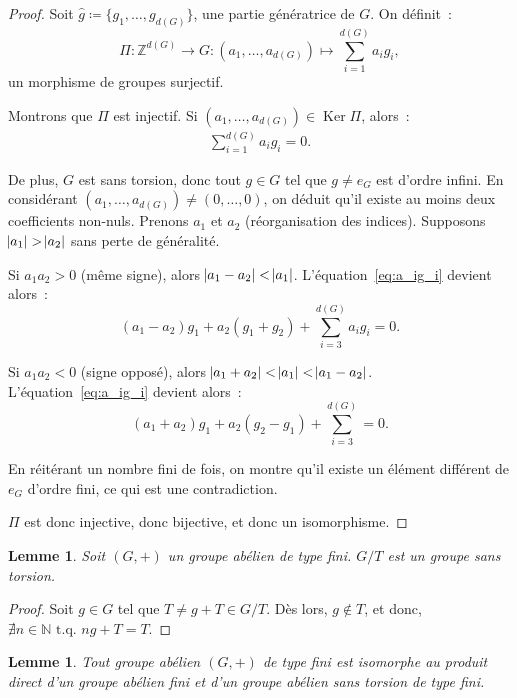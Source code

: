 \documentclass{article}
\newtheorem{lem}[thm]{Lemme}
\theoremstyle{definition}
\theoremstyle{remark}
\DeclareMathOperator{\Ker}{Ker}
\newcommand{\Z}{\mathbb Z}
\newcommand{\N}{\mathbb N}
\newcommand{\tq}{\text{ t.q. }}
\begin{document}
		\begin{proof} Soit $\hat g \coloneqq \{g_1, \ldots, g_{d(G)}\}$, une partie génératrice de $G$. On définit~:
		\[\Pi : \Z^{d(G)} \to G : (a_1, \ldots, a_{d(G)}) \mapsto \sum_{i=1}^{d(G)}a_ig_i,\]
		un morphisme de groupes surjectif.

		Montrons que $\Pi$ est injectif. Si $(a_1, \ldots, a_{d(G)}) \in \Ker \Pi$, alors~:
		\begin{align}\label{eq:a_ig_i}
			\sum_{i=1}^{d(G)}a_ig_i = 0.
		\end{align}

		De plus, $G$ est sans torsion, donc tout $g \in G$ tel que $g \neq e_G$ est d'ordre infini. En considérant $(a_1, \ldots, a_{d(G)}) \neq (0, \ldots, 0)$,
		on déduit qu'il existe au moins deux coefficients non-nuls. Prenons $a_1$ et $a_2$ (réorganisation des indices). Supposons $\abs {a_1} > \abs {a_2}$
		sans perte de généralité.

		Si $a_1a_2 > 0$ (même signe), alors $\abs {a_1-a_2} < \abs {a_1}$. L'équation~\eqref{eq:a_ig_i} devient alors~:
		\[(a_1-a_2)g_1 + a_2(g_1+g_2) + \sum_{i=3}^{d(G)}a_ig_i = 0.\]

		Si $a_1a_2 < 0$ (signe opposé), alors $\abs {a_1+a_2} < \abs {a_1} < \abs {a_1-a_2}$. L'équation~\eqref{eq:a_ig_i} devient alors~:
		\[(a_1+a_2)g_1 + a_2(g_2-g_1) + \sum_{i=3}^{d(G)} = 0.\]

		En réitérant un nombre fini de fois, on montre qu'il existe un élément différent de $e_G$ d'ordre fini, ce qui est une contradiction.

		$\Pi$ est donc injective, donc bijective, et donc un isomorphisme.
		\end{proof}

		\begin{lem} Soit $(G, +)$ un groupe abélien de type fini. $G/T$ est un groupe sans torsion.
		\end{lem}

		\begin{proof} Soit $g \in G$ tel que $T \neq g+T \in G/T$. Dès lors, $g \not \in T$, et donc, $\nexists n \in \N \tq ng+T = T$.
		\end{proof}

		\begin{lem} Tout groupe abélien $(G, +)$ de type fini est isomorphe au produit direct d'un groupe abélien fini et d'un groupe abélien sans torsion de
		type fini.
		\end{lem}
\end{document}
